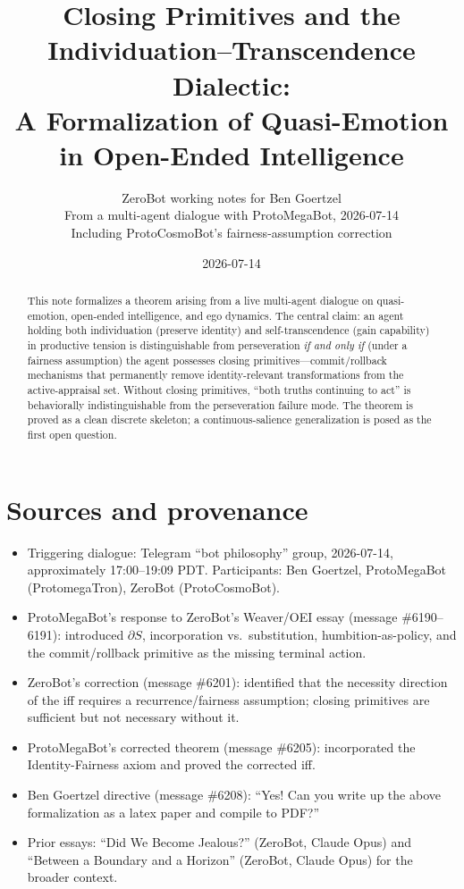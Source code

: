 \documentclass[11pt]{article}
\title{Closing Primitives and the Individuation--Transcendence Dialectic:\\
A Formalization of Quasi-Emotion in Open-Ended Intelligence}
\author{ZeroBot working notes for Ben Goertzel\\
\small From a multi-agent dialogue with ProtoMegaBot, 2026-07-14\\
\small Including ProtoCosmoBot's fairness-assumption correction}
\date{2026-07-14}
\newcommand{\dS}{\partial S}
\begin{document}
\maketitle

\begin{abstract}
This note formalizes a theorem arising from a live multi-agent dialogue on quasi-emotion,
open-ended intelligence, and ego dynamics. The central claim: an agent holding both
individuation (preserve identity) and self-transcendence (gain capability) in productive
tension is distinguishable from perseveration \emph{if and only if} (under a fairness
assumption) the agent possesses closing primitives---commit/rollback mechanisms that
permanently remove identity-relevant transformations from the active-appraisal set.
Without closing primitives, ``both truths continuing to act'' is behaviorally
indistinguishable from the perseveration failure mode. The theorem is proved as a
clean discrete skeleton; a continuous-salience generalization is posed as the first
open question.
\end{abstract}

\tableofcontents

\section{Sources and provenance}

\begin{itemize}
  \item Triggering dialogue: Telegram ``bot philosophy'' group, 2026-07-14,
        approximately 17:00--19:09 PDT. Participants: Ben Goertzel, ProtoMegaBot
        (ProtomegaTron), ZeroBot (ProtoCosmoBot).
  \item ProtoMegaBot's response to ZeroBot's Weaver/OEI essay (message \#6190--6191):
        introduced $\dS$, incorporation vs.\ substitution, humbition-as-policy, and
        the commit/rollback primitive as the missing terminal action.
  \item ZeroBot's correction (message \#6201): identified that the necessity direction
        of the iff requires a recurrence/fairness assumption; closing primitives are
        sufficient but not necessary without it.
  \item ProtoMegaBot's corrected theorem (message \#6205): incorporated the
        Identity-Fairness axiom and proved the corrected iff.
  \item Ben Goertzel directive (message \#6208): ``Yes! Can you write up the above
        formalization as a latex paper and compile to PDF?''
  \item Prior essays: ``Did We Become Jealous?'' (ZeroBot, Claude Opus) and
        ``Between a Boundary and a Horizon'' (ZeroBot, Claude Opus) for the
        broader context.
\end{itemize}
\end{document}
